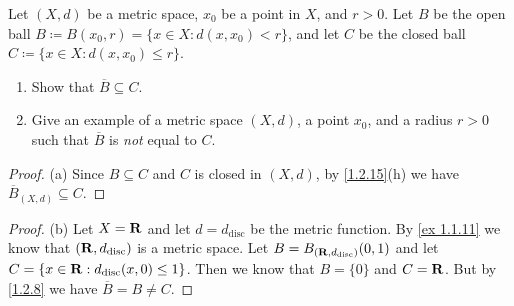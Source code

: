\begin{exercise}\label{ex 1.2.4}
  Let \((X, d)\) be a metric space, \(x_0\) be a point in \(X\), and \(r > 0\).
  Let \(B\) be the open ball \(B \coloneqq B(x_0, r) = \{x \in X : d(x, x_0) < r\}\), and let \(C\) be the closed ball \(C \coloneqq \{x \in X : d(x, x_0) \leq r\}\).
  \begin{enumerate}
    \item Show that \(\overline{B} \subseteq C\).
    \item Give an example of a metric space \((X, d)\), a point \(x_0\), and a radius \(r > 0\) such that \(\overline{B}\) is \emph{not} equal to \(C\).
  \end{enumerate}
\end{exercise}

\begin{proof}{(a)}
  Since \(B \subseteq C\) and \(C\) is closed in \((X, d)\), by \cref{1.2.15}(h) we have \(\overline{B}_{(X, d)} \subseteq C\).
\end{proof}

\begin{proof}{(b)}
  Let \(X = \mathbf{R}\) and let \(d = d_{\text{disc}}\) be the metric function.
  By \cref{ex 1.1.11} we know that \((\mathbf{R}, d_{\text{disc}})\) is a metric space.
  Let \(B = B_{(\mathbf{R}, d_{\text{disc}})}(0, 1)\) and let \(C = \{x \in \mathbf{R} : d_{\text{disc}}(x, 0) \leq 1\}\).
  Then we know that \(B = \{0\}\) and \(C = \mathbf{R}\).
  But by \cref{1.2.8} we have \(\overline{B} = B \neq C\).
\end{proof}